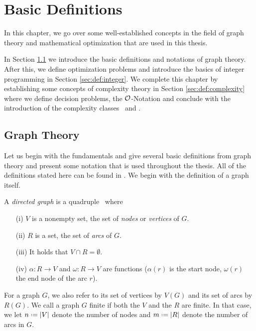 \section{Basic Definitions}
\label{sec:def}

In this chapter, we go over some well-established concepts in the field of graph theory and mathematical optimization that are used in this thesis.\medskip

In Section \ref{sec:def:graphtheory} we introduce the basic definitions and notations of graph theory. After this, we define optimization problems and introduce the basics of integer programming in Section \ref{sec:def:integer}. We complete this chapter by establishing some concepts of complexity theory in Section \ref{sec:def:complexity} where we define decision problems, the $\mathcal{O}$-Notation and conclude with the introduction of the complexity classes \PP\ and \NP.

\subsection{Graph Theory}
\label{sec:def:graphtheory}

Let us begin with the fundamentals and give several basic definitions from graph theory and present some notation that is used throughout the thesis. All of the definitions stated here can be found in \cite{KN12}. We begin with the definition of a graph itself.

\begin{definition}
	\label{def:graph}
	A \textit{directed graph} is a quadruple \graph\ where
	\begin{itemize}
		\item[(i)] $V$ is a nonempty set, the set of \textit{nodes} or \textit{vertices} of $G$.
		\item[(ii)] $R$ is a set, the set of \textit{arcs} of $G$.
		\item[(iii)] It holds that $V \cap R = \emptyset$.
		\item[(iv)] $\alpha \colon R \to V$ and $\omega \colon R \to V$ are functions ($\alpha(r)$ is the start node, $\omega(r)$ the end node of the arc $r$).
	\end{itemize}
\end{definition}

For a graph $G$, we also refer to its set of vertices by $V(G)$ and its set of arcs by $R(G)$. We call a graph $G$ finite if both the $V$ and the $R$ are finite. In that case, we let $n \defeq |V|$ denote the number of nodes and $m \defeq |R|$ denote the number of arcs in $G$.

